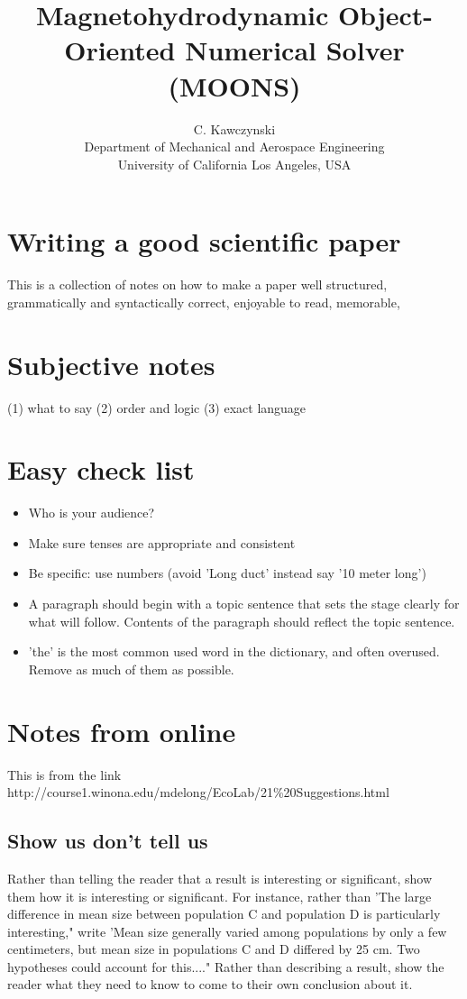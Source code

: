 \documentclass[11pt]{article}
\begin{document}
\doublespacing
\title{Magnetohydrodynamic Object-Oriented Numerical Solver (MOONS)}
\author{C. Kawczynski \\
Department of Mechanical and Aerospace Engineering \\
University of California Los Angeles, USA\\}
\maketitle

\section{Writing a good scientific paper}
This is a collection of notes on how to make a paper well structured, grammatically and syntactically correct, enjoyable to read, memorable, 

\section{Subjective notes}
(1) what to say
(2) order and logic
(3) exact language


\section{Easy check list}
\begin{itemize}
\item Who is your audience?
\item Make sure tenses are appropriate and consistent
\item Be specific: use numbers (avoid 'Long duct' instead say '10 meter long')
\item A paragraph should begin with a topic sentence that sets the stage clearly for what will follow. Contents of the paragraph should reflect the topic sentence.
\item 'the' is the most common used word in the dictionary, and often overused. Remove as much of them as possible.
\end{itemize}

\section{Notes from online}
This is from the link
http://course1.winona.edu/mdelong/EcoLab/21\%20Suggestions.html

\subsection{Show us don't tell us}
Rather than telling the reader that a result is interesting or significant, show them how it is interesting or significant. For instance, rather than 'The large difference in mean size between population C and population D is particularly interesting," write 'Mean size generally varied among populations by only a few centimeters, but mean size in populations C and D differed by 25 cm. Two hypotheses could account for this...." Rather than describing a result, show the reader what they need to know to come to their own conclusion about it.
\end{document}
